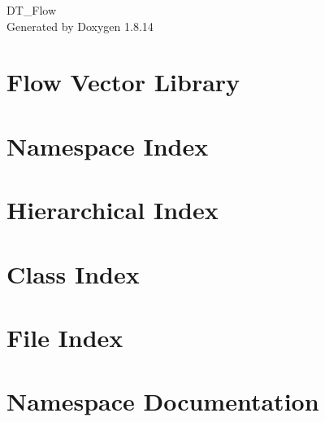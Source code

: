\documentclass[twoside]{book}
\newcommand{\+}{\discretionary{\mbox{\scriptsize$\hookleftarrow$}}{}{}}
\newcommand{\clearemptydoublepage}{%
  \newpage{\pagestyle{empty}\cleardoublepage}%
}
\begin{document}
\hypersetup{pageanchor=false,
             bookmarksnumbered=true,
             pdfencoding=unicode
            }
\begin{titlepage}
\vspace*{7cm}
\begin{center}%
{\Large D\+T\+\_\+\+Flow }\\
\vspace*{1cm}
{\large Generated by Doxygen 1.8.14}\\
\end{center}
\end{titlepage}
\clearemptydoublepage
{}
\tableofcontents
\clearemptydoublepage
{}
\hypersetup{pageanchor=true}

\chapter{Flow Vector Library}
\label{md_DT_Flow_docs_README}

\chapter{Namespace Index}

\chapter{Hierarchical Index}

\chapter{Class Index}

\chapter{File Index}

\chapter{Namespace Documentation}

\end{document}
